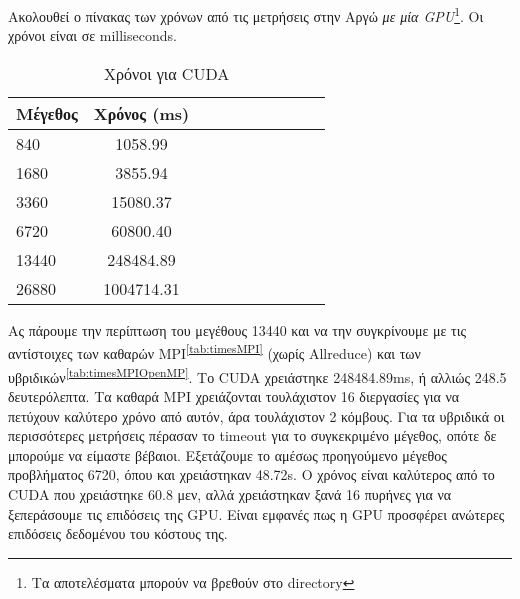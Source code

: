 Ακολουθεί ο πίνακας των χρόνων από τις μετρήσεις στην Αργώ \emph{με μία GPU}\footnote{Τα αποτελέσματα μπορούν να βρεθούν στο directory }. Οι χρόνοι είναι σε milliseconds.
\begin{table}[H]
\centering
\small
\begin{tabular}{| l | c | c | c | c | c | c | c | c | c |}
\hline
Μέγεθος & Χρόνος (\si{\milli\second}) \\
\hline
840 & 1058.99 \\
\hline
1680 & 3855.94 \\
\hline
3360 & 15080.37 \\
\hline
6720 &  60800.40 \\
\hline
13440 & 248484.89 \\
\hline
26880 & 1004714.31 \\
\hline
\end{tabular}
\caption{Χρόνοι για CUDA}
\label{tab:timesCUDA}
\end{table}
\begin{multicols}{2}
Ας πάρουμε την περίπτωση του μεγέθους 13440 και να την συγκρίνουμε με τις αντίστοιχες των καθαρών MPI\textsuperscript{\ref{tab:timesMPI}} (χωρίς Allreduce) και των υβριδικών\textsuperscript{\ref{tab:timesMPIOpenMP}}. Το CUDA χρειάστηκε 248484.89\si{\milli\second}, ή αλλιώς 248.5 δευτερόλεπτα. Τα καθαρά MPI χρειάζονται τουλάχιστον 16 διεργασίες για να πετύχουν καλύτερο χρόνο από αυτόν, άρα τουλάχιστον 2 κόμβους. Για τα υβριδικά οι περισσότερες μετρήσεις πέρασαν το timeout για το συγκεκριμένο μέγεθος, οπότε δε μπορούμε να είμαστε βέβαιοι. Εξετάζουμε το αμέσως προηγούμενο μέγεθος προβλήματος 6720, όπου και χρειάστηκαν 48.72\si{\second}. Ο χρόνος είναι καλύτερος από το CUDA που χρειάστηκε 60.8 μεν, αλλά χρειάστηκαν ξανά 16 πυρήνες για να ξεπεράσουμε τις επιδόσεις της GPU. Είναι εμφανές πως η GPU προσφέρει ανώτερες επιδόσεις δεδομένου του κόστους της.
\end{multicols}